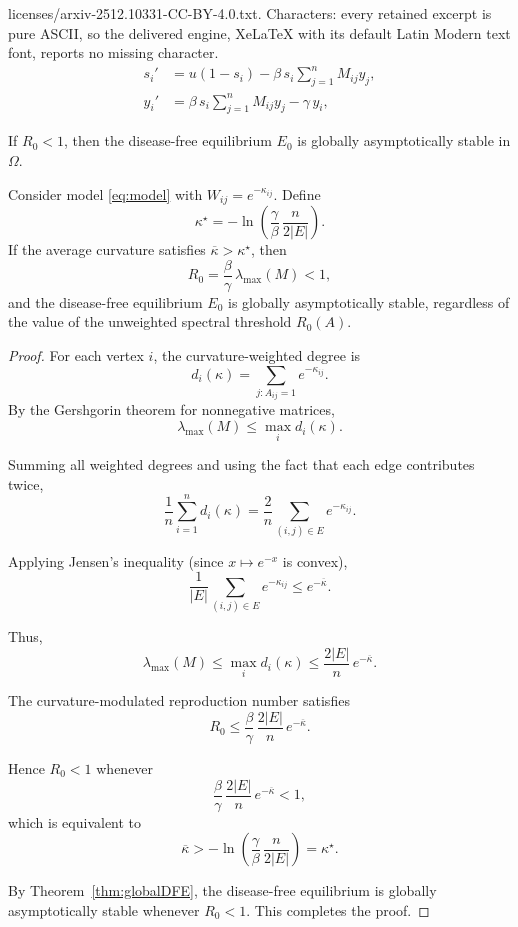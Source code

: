 \documentclass[10pt,a4paper]{amsart}
\begin{document}
licenses/arxiv-2512.10331-CC-BY-4.0.txt. Characters: every retained excerpt is pure ASCII, so the delivered engine, XeLaTeX with its default Latin Modern text font, reports no missing character.
\begin{equation}
\label{eq:model}
\begin{aligned}
    s_i' &= u(1 - s_i) - \beta\, s_i \sum_{j=1}^n M_{ij} y_j, \\
    y_i' &= \beta\, s_i \sum_{j=1}^n M_{ij} y_j - \gamma\, y_i,
\end{aligned}
\end{equation}

\begin{theorem}
\label{thm:globalDFE}
If $R_0 < 1$, then the disease-free equilibrium $E_0$ is globally
asymptotically stable in $\Omega$.
\end{theorem}

\begin{theorem}
\label{thm:geomthreshold}
Consider model \eqref{eq:model} with $W_{ij}=e^{-\kappa_{ij}}$.  
Define
\[
    \kappa^\star
    =
    -\ln\!\left(
        \frac{\gamma}{\beta}\,
        \frac{n}{2|E|}
    \right).
\]
If the average curvature satisfies $\overline{\kappa} > \kappa^\star$, then
\[
    R_0
    =
    \frac{\beta}{\gamma}\,\lambda_{\max}(M)
    < 1,
\]
and the disease-free equilibrium $E_0$ is globally asymptotically stable,
regardless of the value of the unweighted spectral threshold $R_0(A)$.
\end{theorem}

\begin{proof}
For each vertex $i$, the curvature-weighted degree is
\[
    d_i(\kappa)
    =
    \sum_{j : A_{ij}=1} e^{-\kappa_{ij}}.
\]
By the Gershgorin theorem for nonnegative matrices,
\[
    \lambda_{\max}(M) \le \max_i d_i(\kappa).
\]

Summing all weighted degrees and using the fact that each edge contributes twice,
\[
    \frac{1}{n}\sum_{i=1}^n d_i(\kappa)
    =
    \frac{2}{n}
    \sum_{(i,j)\in E} e^{-\kappa_{ij}}.
\]

Applying Jensen's inequality (since $x\mapsto e^{-x}$ is convex),
\[
    \frac{1}{|E|}
    \sum_{(i,j)\in E} e^{-\kappa_{ij}}
    \le
    e^{-\overline{\kappa}}.
\]

Thus,
\[
    \lambda_{\max}(M)
    \le
    \max_i d_i(\kappa)
    \le
    \frac{2|E|}{n}\,e^{-\overline{\kappa}}.
\]

The curvature-modulated reproduction number satisfies
\[
    R_0
    \le
    \frac{\beta}{\gamma}\,
    \frac{2|E|}{n}\,
    e^{-\overline{\kappa}}.
\]

Hence $R_0<1$ whenever
\[
    \frac{\beta}{\gamma}\,
    \frac{2|E|}{n}\,
    e^{-\overline{\kappa}}
    < 1,
\]
which is equivalent to
\[
    \overline{\kappa} > -\ln\!\left(
        \frac{\gamma}{\beta}\,
        \frac{n}{2|E|}
    \right)
    = \kappa^\star.
\]

By Theorem~\ref{thm:globalDFE}, the disease-free equilibrium is globally
asymptotically stable whenever $R_0<1$.  
This completes the proof.
\end{proof}
\end{document}
